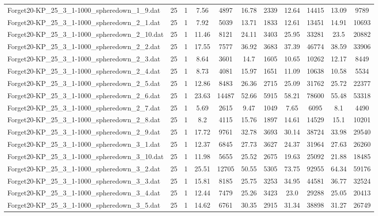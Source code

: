 \begin{table}[!ht]
\begin{tabular}{lcccccccccc}
Forget20-KP\_25\_3\_1-1000\_spheredown\_1\_9.dat & 25 & 1 & 7.56 & 4897 & 16.78 & 2339 & 12.64 & 14415 & 13.09 & 9789 \\
Forget20-KP\_25\_3\_1-1000\_spheredown\_2\_1.dat & 25 & 1 & 7.92 & 5039 & 13.71 & 1833 & 12.61 & 13451 & 14.91 & 10693 \\
Forget20-KP\_25\_3\_1-1000\_spheredown\_2\_10.dat & 25 & 1 & 11.46 & 8121 & 24.11 & 3403 & 25.95 & 33281 & 23.5 & 20882 \\
Forget20-KP\_25\_3\_1-1000\_spheredown\_2\_2.dat & 25 & 1 & 17.55 & 7577 & 36.92 & 3683 & 37.39 & 46774 & 38.59 & 33906 \\
Forget20-KP\_25\_3\_1-1000\_spheredown\_2\_3.dat & 25 & 1 & 8.64 & 3601 & 14.7 & 1605 & 10.65 & 10262 & 12.17 & 8449 \\
Forget20-KP\_25\_3\_1-1000\_spheredown\_2\_4.dat & 25 & 1 & 8.73 & 4081 & 15.97 & 1651 & 11.09 & 10638 & 10.58 & 5534 \\
Forget20-KP\_25\_3\_1-1000\_spheredown\_2\_5.dat & 25 & 1 & 12.86 & 8483 & 26.36 & 2715 & 25.09 & 31762 & 25.72 & 22377 \\
Forget20-KP\_25\_3\_1-1000\_spheredown\_2\_6.dat & 25 & 1 & 23.63 & 14487 & 52.66 & 5915 & 58.21 & 78600 & 55.48 & 53318 \\
Forget20-KP\_25\_3\_1-1000\_spheredown\_2\_7.dat & 25 & 1 & 5.69 & 2615 & 9.47 & 1049 & 7.65 & 6095 & 8.1 & 4490 \\
Forget20-KP\_25\_3\_1-1000\_spheredown\_2\_8.dat & 25 & 1 & 8.2 & 4115 & 15.76 & 1897 & 14.61 & 14529 & 15.1 & 10201 \\
Forget20-KP\_25\_3\_1-1000\_spheredown\_2\_9.dat & 25 & 1 & 17.72 & 9761 & 32.78 & 3693 & 30.14 & 38724 & 33.98 & 29540 \\
Forget20-KP\_25\_3\_1-1000\_spheredown\_3\_1.dat & 25 & 1 & 12.37 & 6845 & 27.73 & 3627 & 24.37 & 31964 & 27.63 & 26260 \\
Forget20-KP\_25\_3\_1-1000\_spheredown\_3\_10.dat & 25 & 1 & 11.98 & 5655 & 25.52 & 2675 & 19.63 & 25092 & 21.88 & 18485 \\
Forget20-KP\_25\_3\_1-1000\_spheredown\_3\_2.dat & 25 & 1 & 25.51 & 12705 & 50.55 & 5305 & 73.75 & 92955 & 64.34 & 59176 \\
Forget20-KP\_25\_3\_1-1000\_spheredown\_3\_3.dat & 25 & 1 & 15.81 & 8185 & 25.75 & 3253 & 34.95 & 44581 & 36.77 & 32524 \\
Forget20-KP\_25\_3\_1-1000\_spheredown\_3\_4.dat & 25 & 1 & 12.44 & 7479 & 25.26 & 3423 & 23.0 & 29288 & 25.05 & 20413 \\
Forget20-KP\_25\_3\_1-1000\_spheredown\_3\_5.dat & 25 & 1 & 14.62 & 6761 & 30.35 & 2915 & 31.34 & 38898 & 31.27 & 26749 \\

\end{tabular}
\end{table}

